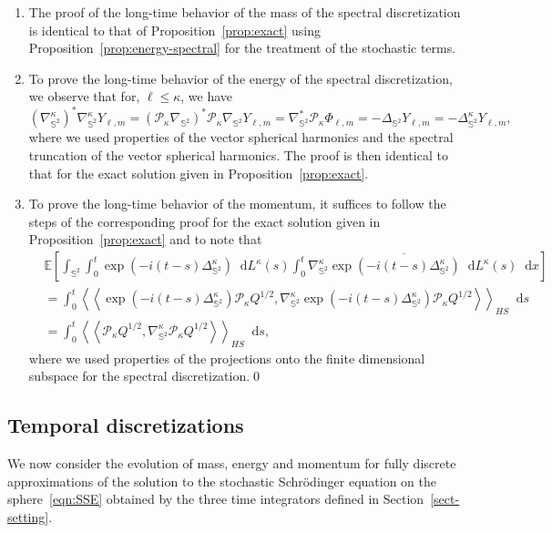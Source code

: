 \documentclass[11pt]{amsart}
\newcommand{\E}{{\mathbb E}}
\newcommand{\IS}{\mathbb{S}}
\newcommand*\dd{\mathop{}\!\mathrm{d}}
\newcommand{\Deltalb}{\Delta_{\IS^2}}
\newcommand{\nablalb}{\nabla_{\IS^{2}}}
\newcommand{\cP}{\mathcal{P}}
\begin{document}
\begin{appendixproof}
  \begin{enumerate}[label=\roman*)]
   \item The proof of the long-time behavior of the mass of the spectral discretization
   is identical to that of Proposition~\ref{prop:exact} using Proposition~\ref{prop:energy-spectral} for the treatment of the stochastic terms.
   \item To prove the long-time behavior of the energy of the spectral discretization, we observe that for, $\ell\leq\kappa$, we have
	$$
	(\nablalb^\kappa)^\ast\nablalb^\kappa Y_{\ell,m}=(\cP_\kappa \nablalb)^\ast\cP_\kappa\nablalb Y_{\ell,m} = \nabla_{\IS^{2}}^\ast\cP_\kappa \Phi_{\ell,m}=-\Deltalb Y_{\ell,m}=-\Deltalb^\kappa Y_{\ell,m},
	$$
	where we used properties of the vector spherical harmonics and the spectral truncation of the vector spherical harmonics.
	The proof is then identical to that for the exact solution given in Proposition~\ref{prop:exact}.

  \item To prove the long-time behavior of the momentum, it suffices to follow the steps of the corresponding proof for the exact solution given in Proposition~\ref{prop:exact} and
  to note that
	\begin{align*}
		&\E\left[\int_{\IS^2} \int_{0}^{t}\exp{(-i(t-s)\Deltalb^\kappa)}\dd L^\kappa(s)\overline{\int_{0}^{t}\nablalb^\kappa \exp{(-i(t-s)\Deltalb^\kappa)}\dd L^\kappa(s)}\dd x\right]\\
		&=\int_{0}^{t}\left<\left<\exp{(-i(t-s)\Deltalb^\kappa)\cP_\kappa Q^{1/2}},\nablalb^\kappa \exp{(-i(t-s)\Deltalb^\kappa)}\cP_\kappa Q^{1/2}\right>\right>_{HS}\dd s\\
		&=\int_{0}^{t}\left<\left<\cP_\kappa Q^{1/2},\nablalb^\kappa \cP_\kappa Q^{1/2}\right>\right>_{HS}\dd s,
	\end{align*}
	where we used properties of the projections onto the finite dimensional subspace for the spectral discretization.\qed
\end{enumerate}
\renewcommand{\qedsymbol}{}
\end{appendixproof}

\subsection{Temporal discretizations}\label{sch-time}

We now consider the evolution of mass, energy and momentum for fully discrete approximations of the solution to the stochastic Schrödinger equation on the sphere~\eqref{eqn:SSE}
obtained by the three time integrators defined in Section~\ref{sect-setting}.
\end{document}
